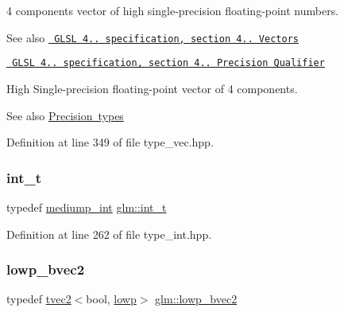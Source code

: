 4 components vector of high single-\/precision floating-\/point numbers.

\begin{DoxySeeAlso}{See also}
\href{http://www.opengl.org/registry/doc/GLSLangSpec.4.20.8.pdf}{\texttt{ G\+L\+SL 4.. specification, section 4.. Vectors}} 

\href{http://www.opengl.org/registry/doc/GLSLangSpec.4.20.8.pdf}{\texttt{ G\+L\+SL 4.. specification, section 4.. Precision Qualifier}}
\end{DoxySeeAlso}
High Single-\/precision floating-\/point vector of 4 components. \begin{DoxySeeAlso}{See also}
\mbox{\hyperlink{group__core__precision}{Precision types}} 
\end{DoxySeeAlso}


Definition at line 349 of file type\+\_\+vec.\+hpp.

\mbox{\label{group__core__precision_gacd01d170508f812968875b0f2e730e8c}} 
\subsubsection{\texorpdfstring{int\_t}{int\_t}}
{\footnotesize\ttfamily typedef \mbox{\hyperlink{group__core__precision_ga2a3dcbcd7f4e17663d393a12061ac6ac}{mediump\+\_\+int}} \mbox{\hyperlink{group__core__precision_gacd01d170508f812968875b0f2e730e8c}{glm\+::int\+\_\+t}}}



Definition at line 262 of file type\+\_\+int.\+hpp.

\mbox{\label{group__core__precision_gaf17553233b30d9ed413e822847c4ea8f}} 
\subsubsection{\texorpdfstring{lowp\_bvec2}{lowp\_bvec2}}
{\footnotesize\ttfamily typedef \mbox{\hyperlink{structglm_1_1tvec2}{tvec2}}$<$bool, \mbox{\hyperlink{namespaceglm_a0f04f086094c747d227af4425893f545ae161af3fc695e696ce3bf69f7332bc2d}{lowp}}$>$ \mbox{\hyperlink{group__core__precision_gaf17553233b30d9ed413e822847c4ea8f}{glm\+::lowp\+\_\+bvec2}}}

